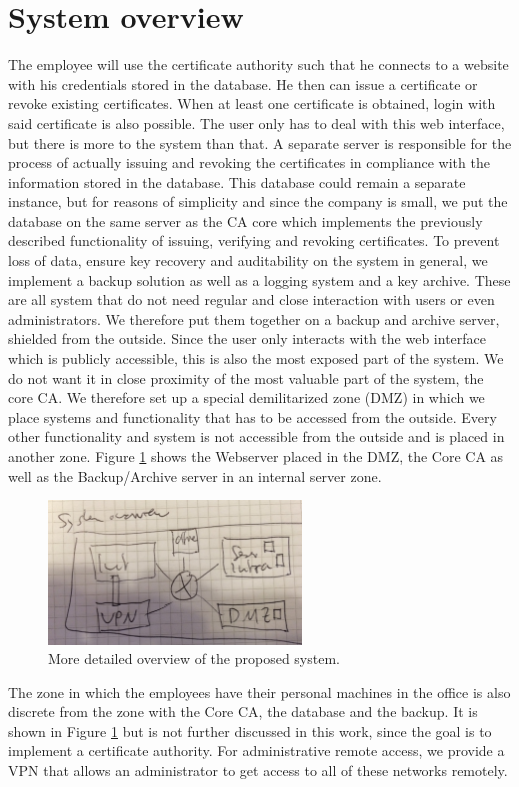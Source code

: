 \documentclass[a4paper, toc=index, 12pt, DIV14, twoside, BCOR2cm, headsepline, numbers=noenddot, bibliography=totoc]{scrbook}
\begin{document}
\section{System overview}
The employee will use the certificate authority such that he connects to a website with his credentials stored in the database. He then can issue a certificate or revoke existing certificates. When at least one certificate is obtained, login with said certificate is also possible. The user only has to deal with this web interface, but there is more to the system than that. A separate server is responsible for the process of actually issuing and revoking the certificates in compliance with the information stored in the database. This database could remain a separate instance, but for reasons of simplicity and since the company is small, we put the database on the same server as the CA core which implements the previously described functionality of issuing, verifying and revoking certificates. To prevent loss of data, ensure key recovery and auditability on the system in general, we implement a backup solution as well as a logging system and a key archive. These are all system that do not need regular and close interaction with users or even administrators. We therefore put them together on a backup and archive server, shielded from the outside.\newline
Since the user only interacts with the web interface which is publicly accessible, this is also the most exposed part of the system. We do not want it in close proximity of the most valuable part of the system, the core CA. We therefore set up a special demilitarized zone (DMZ) in which we place systems and functionality that has to be accessed from the outside. Every other functionality and system is not accessible from the outside and is placed in another zone.\newline
Figure \ref{systemoverview} shows the Webserver placed in the DMZ, the Core CA as well as the Backup/Archive server in an internal server zone. \newline
\begin{figure}[H]
  \centering
    \includegraphics[width=0.6\textwidth]{images/systemoverview.jpg}  
  \caption{More detailed overview of the proposed system.}
  \label{systemoverview}
\end{figure}
The zone in which the employees have their personal machines in the office is also discrete from the zone with the Core CA, the database and the backup. It is shown in Figure \ref{systemoverview} but is not further discussed in this work, since the goal is to implement a certificate authority.\newline
For administrative remote access, we provide a VPN that allows an administrator to get access to all of these networks remotely.
\end{document}
